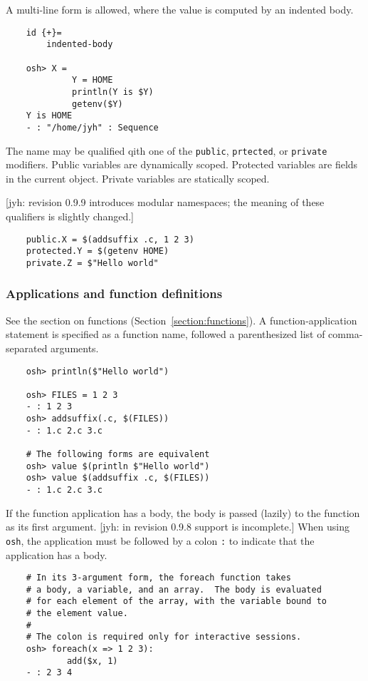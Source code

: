 A multi-line form is allowed, where the value is computed by an indented body.

\begin{verbatim}
    id {+}=
        indented-body

    osh> X =
             Y = HOME
             println(Y is $Y)
             getenv($Y)
    Y is HOME
    - : "/home/jyh" : Sequence
\end{verbatim}

The name may be qualified qith one of the \verb+public+, \verb+prtected+, or \verb+private+
modifiers.  Public variables are dynamically scoped.  Protected variables are fields in the current
object.  Private variables are statically scoped.

[jyh: revision 0.9.9 introduces modular namespaces; the meaning of these qualifiers is slightly changed.]

\begin{verbatim}
    public.X = $(addsuffix .c, 1 2 3)
    protected.Y = $(getenv HOME)
    private.Z = $"Hello world"
\end{verbatim}

\subsubsection{Applications and function definitions}

See the section on functions (Section~\ref{section:functions}).  A function-application statement is specified as a
function name, followed a parenthesized list of comma-separated arguments.

\begin{verbatim}
    osh> println($"Hello world")

    osh> FILES = 1 2 3
    - : 1 2 3
    osh> addsuffix(.c, $(FILES))
    - : 1.c 2.c 3.c

    # The following forms are equivalent
    osh> value $(println $"Hello world")
    osh> value $(addsuffix .c, $(FILES))
    - : 1.c 2.c 3.c
\end{verbatim}

If the function application has a body, the body is passed (lazily) to the function as its first
argument.  [jyh: in revision 0.9.8 support is incomplete.]  When using \verb+osh+, the application
must be followed by a colon \verb+:+ to indicate that the application has a body.

\begin{verbatim}
    # In its 3-argument form, the foreach function takes
    # a body, a variable, and an array.  The body is evaluated
    # for each element of the array, with the variable bound to
    # the element value.
    #
    # The colon is required only for interactive sessions.
    osh> foreach(x => 1 2 3):
            add($x, 1)
    - : 2 3 4
\end{verbatim}


